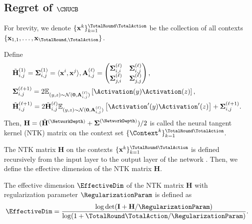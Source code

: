 \documentclass{article}
\theoremstyle{plain}
\begin{document}
\subsection{Regret of $\CNUCB$}
\label{subsec:CN-UCB-Reg}
For brevity, we denote $\{ \mathbf{x}^k \}_{k=1}^{\TotalRound \TotalAction}$ be the collection of all contexts $\{ \mathbf{x}_{1,1}, \ldots, \mathbf{x}_{\TotalRound, \TotalAction}\}$.
%

\begin{definition} \cite{jacot2018ntk, cao2019generalization} \label{def_NTK matrix}
Define
    \begin{align*}
        & \tilde{\mathbf{H}}_{i,j}^{(1)} = \boldsymbol{\Sigma}_{i,j}^{(1)} = \langle \mathbf{x}^i, \mathbf{x}^j \rangle, \mathbf{A}_{i,j}^{(\ell)}= \begin{pmatrix} \boldsymbol{\Sigma}_{i,i}^{(\ell)} & \boldsymbol{\Sigma}_{i,j}^{(\ell)} \\ \boldsymbol{\Sigma}_{j,i}^{(\ell)} & \boldsymbol{\Sigma}_{j,j}^{(\ell)} \end{pmatrix},
        \\
        & \boldsymbol{\Sigma}_{i, j}^{(\ell +1)} = 2 \mathbb{E}_{(y,z) \sim \mathcal{N}(\mathbf{0}, \mathbf{A}_{i,j}^{(\ell)})} \left[ \Activation(y) \Activation(z) \right], 
        \\        
        & \tilde{\mathbf{H}}_{i,j}^{(\ell +1)} = 2 \tilde{\mathbf{H}}_{i,j}^{(\ell)} \mathbb{E}_{(y,z) \sim \mathcal{N}(\mathbf{0}, \mathbf{A}_{i,j}^{(\ell)})} \left[ \Activation'(y) \Activation'(z)\right]
         + \boldsymbol{\Sigma}_{i, j}^{(\ell +1)}.
    \end{align*}
Then, $\mathbf{H} = (\tilde{\mathbf{H}}^{(\NetworkDepth)} + \boldsymbol{\Sigma}^{(\NetworkDepth)})/2$ is called the neural tangent kernel (NTK) matrix on the context set $\{ \Context^k\}_{k=1}^{\TotalRound \TotalAction}$.
\end{definition}
%
The NTK matrix $\mathbf{H}$ on the contexts $\{ \mathbf{x}^k \}_{k=1}^{\TotalRound \TotalAction}$ is defined recursively from the input layer to the output layer of the network \cite{zhou2020neural,  zhang2021neural}. 
Then,
we define the effective dimension of the NTK matrix $\mathbf{H}$.
%
\begin{definition} \label{def_effective dimension}
The effective dimension $\EffectiveDim$ of the NTK matrix $\mathbf{H}$ with regularization parameter $\RegularizationParam$ is defined as
\begin{equation} \label{eq_effective dimenstion}
    \EffectiveDim = \frac{ \log \det ( \mathbf{I} + \mathbf{H}/\RegularizationParam )}{\log (1+\TotalRound \TotalAction / \RegularizationParam )}.    
\end{equation}
\end{definition}
\end{document}
